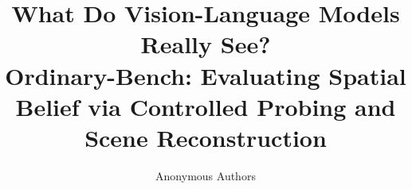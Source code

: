 \documentclass[11pt]{article}
\title{What Do Vision-Language Models Really See?\\
Ordinary-Bench: Evaluating Spatial Belief via Controlled Probing and Scene Reconstruction}
\author{Anonymous Authors}
\date{}
\begin{document}
\maketitle

\begin{abstract}

\end{abstract}













\end{document}
